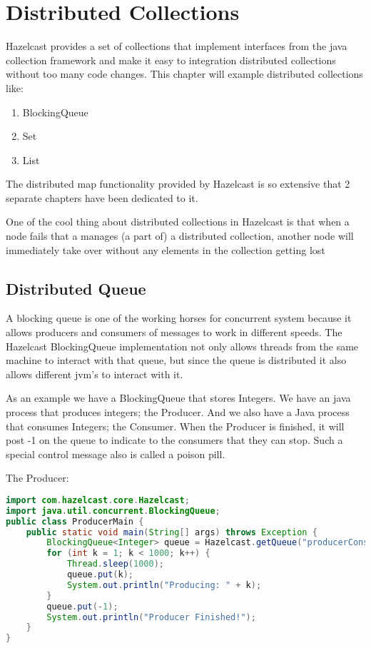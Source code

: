 \chapter{Distributed Collections}

Hazelcast provides a set of collections that implement interfaces from the java collection 
framework and make it easy to integration distributed collections without too many code changes.
This chapter will example distributed collections like:
\begin{enumerate}
\item BlockingQueue
\item Set
\item List
\end{enumerate}
The distributed map functionality provided by Hazelcast is so extensive that 2 separate chapters
have been dedicated to it. 

One of the cool thing about distributed collections in Hazelcast is that when a node fails that
a manages (a part of) a distributed collection, another node will immediately take over without
any elements in the collection getting lost

\section{Distributed Queue}

A blocking queue is one of the working horses for concurrent system because it 
allows producers and consumers of messages to work in different speeds. The Hazelcast BlockingQueue
implementation not only allows threads from the same machine to interact with that queue, but
since the queue is distributed it also allows different jvm's to interact with it.

As an example we have a BlockingQueue that stores Integers. We have an java process that produces
integers; the Producer. And we also have a Java process that consumes Integers; the Consumer. When the
Producer is finished, it will post -1 on the queue to indicate to the consumers that they can stop. Such
a special control message also is called a poison pill.

The Producer:
\begin{lstlisting}[language=java]
import com.hazelcast.core.Hazelcast;
import java.util.concurrent.BlockingQueue;
public class ProducerMain {
    public static void main(String[] args) throws Exception {
        BlockingQueue<Integer> queue = Hazelcast.getQueue("producerConsumerQueue");
        for (int k = 1; k < 1000; k++) {
            Thread.sleep(1000);  
            queue.put(k);
            System.out.println("Producing: " + k);
        }
        queue.put(-1);
        System.out.println("Producer Finished!");
    }
}
\end{lstlisting}

